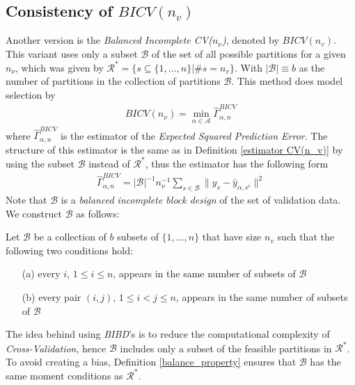 \documentclass[Research_Module_ES.tex]{subfiles}
\begin{document}
\subsection{Consistency of $BICV(n_v)$}
Another version is the \textit{Balanced Incomplete CV($n_\nu$)}, denoted by $BICV(n_v)$. This variant uses only a subset $\mathcal{B}$ of the set of all possible partitions for a given $n_\nu$, which was given by $\mathcal{R}^\ast= \{s\subseteq\{1,\dots,n\}|\# s=n_v\}$. With $|\mathcal{B}|\equiv b$ as the number of partitions in the collection of partitions $\mathcal{B}$. This method does model selection by 
\begin{align*}
	BICV(n_\nu)=\min_{\alpha\in\mathcal{A}}\hat{\Gamma}_{\alpha,n}^{BICV}
\end{align*}
where $\hat{\Gamma}_{\alpha,n}^{BICV}$ is the estimator of the \textit{Expected Squared Prediction Error}. The structure of this estimator is the same as in Definition \ref{estimator CV(n_v)} by using the subset $\mathcal{B}$ instead of $\mathcal{R}^\ast$, thus the estimator has the following form
\begin{align*}
	\hat{\Gamma}_{\alpha,n}^{BICV}=|\mathcal{B}|^{-1}n_\nu^{-1}\sum_{s\in\mathcal{B}}\parallel y_s-\hat{y}_{\alpha,s^c}\parallel^2
\end{align*}
Note that $\mathcal{B}$ is a \textit{balanced incomplete block design} of the set of validation data. We construct $\mathcal{B}$ as follows: 
\begin{defi}
\label{balance_property}
Let $\mathcal{B}$ be a collection of $b$ subsets of $\{ 1,\dots,n\}$ that have size $n_v$ such that the following two conditions hold:
\begin{enumerate}
\item[(a)] every $i$, $1\le i \le n$, appears in the same number of subsets of $\mathcal{B}$
\item[(b)] every pair $(i,j)$, $1\le i < j \le n$, appears in the same number of subsets of $\mathcal{B}$
\end{enumerate}
\end{defi}
The idea behind using \textit{BIBD}'s is to reduce the computational complexity of \textit{Cross-Validation}, hence $\mathcal{B}$ includes only a subset of the feasible partitions in $\mathcal{R}^\ast$. To avoid creating a bias, Definition \ref{balance_property} ensures that $\mathcal{B}$ has the same moment conditions as $\mathcal{R}^\ast$. \\
\end{document}
